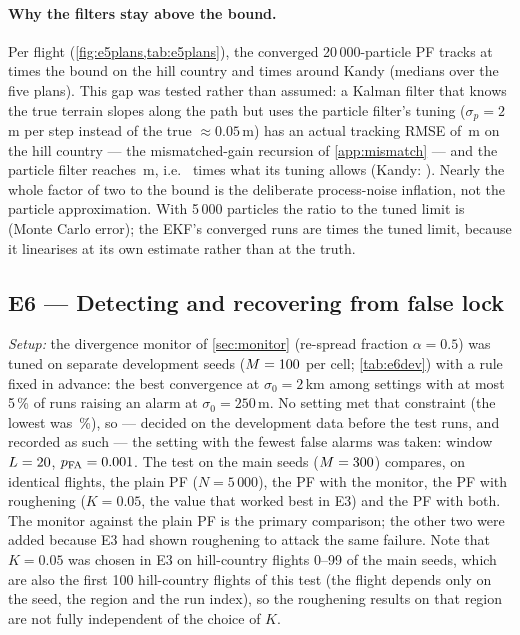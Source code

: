 \paragraph{Why the filters stay above the bound.} Per flight (\cref{fig:e5plans,tab:e5plans}),
the converged 20\,000-particle PF tracks at \EFivePlanHillPfTwoZeroZeroZeroZeroRatio{} times the
bound on the hill country and \EFivePlanKandyPfTwoZeroZeroZeroZeroRatio{} times around Kandy
(medians over the five plans). This gap was tested rather than assumed: a Kalman filter that knows
the true terrain slopes along the path but uses the particle filter's tuning ($\sigma_p = 2$\,m per
step instead of the true $\approx 0.05$\,m) has an actual tracking RMSE of
\EFivePlanHillPfTwoZeroZeroZeroZeroTuned\,m on the hill country --- the mismatched-gain
recursion of \cref{app:mismatch} --- and the particle filter reaches
\EFivePlanHillPfTwoZeroZeroZeroZeroRmse\,m, i.e.\ \EFivePlanHillPfTwoZeroZeroZeroZeroRatioTuned{}
times what its tuning allows (Kandy: \EFivePlanKandyPfTwoZeroZeroZeroZeroRatioTuned). Nearly the
whole factor of two to the bound is the deliberate process-noise inflation, not the particle
approximation. With 5\,000 particles the ratio to the tuned limit is
\EFivePlanHillPfFiveZeroZeroZeroRatioTuned{} (Monte Carlo error); the EKF's converged runs are
\EFivePlanHillEkfRatioTuned{} times the tuned limit, because it linearises at its own estimate
rather than at the truth.

\subsection{E6 --- Detecting and recovering from false lock}\label{sec:e6}
\emph{Setup:} the divergence monitor of \cref{sec:monitor} (re-spread fraction $\alpha = 0.5$)
was tuned on separate development seeds ($M = 100$ per cell; \cref{tab:e6dev}) with a
rule fixed in advance: the best convergence at $\sigma_0 = 2$\,km among settings with at most
5\,\% of runs raising an alarm at $\sigma_0 = 250$\,m. No setting met that constraint (the lowest
was \ESixDevMinFa\,\%), so --- decided on the development data before the test runs, and recorded as such ---
the setting with the fewest false alarms was taken: window $L = 20$, $p_{\mathrm{FA}} =
0.001$. The test on the main seeds ($M = 300$) compares, on identical flights, the
plain PF ($N = 5\,000$), the PF with the monitor, the PF with roughening ($K = 0.05$, the value
that worked best in E3) and the PF with both. The monitor against the plain PF is the primary
comparison; the other two were added because E3 had shown roughening to attack the same failure.
Note that $K = 0.05$ was chosen in E3 on hill-country flights 0--99 of the main seeds, which are
also the first 100 hill-country flights of this test (the flight depends only on the seed, the
region and the run index), so the roughening results on that region are not fully independent of
the choice of $K$.


